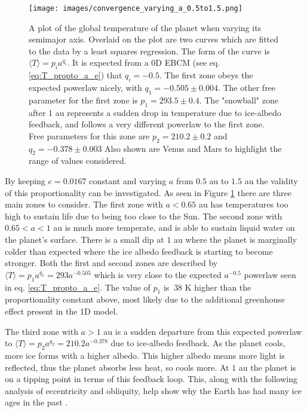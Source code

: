 \documentclass[12pt, onecolumn]{revtex4-2}    %
\begin{document}
\begin{figure}
  \texttt{[image: images/convergence\_varying\_a\_0.5to1.5.png]}
  \caption{
    A plot of the global temperature of the planet when varying its semimajor axis.
    Overlaid on the plot are two curves which are fitted to the data by a least squares regression.
    The form of the curve is $\langle T \rangle = p_i a^{q_i}$.
    It is expected from a 0D EBCM (see eq. \eqref{eq:T_propto_a_e}) that $q_i = -0.5$.
    The first zone obeys the expected powerlaw nicely, with $q_1 = -0.505 \pm 0.004$.
    The other free parameter for the first zone is $p_1 = 293.5 \pm 0.4$.
    The "snowball" zone after 1 au represents a sudden drop in temperature due to ice-albedo feedback, and follows a very different powerlaw to the first zone.
    Free parameters for this zone are $p_2 = 210.2 \pm 0.2$ and $q_2 = -0.378 \pm 0.003$
    Also shown are Venus and Mars to highlight the range of values considered.
  }
  \label{fig:planet_semimajoraxis}
\end{figure}
By keeping $e = 0.0167$ constant and varying $a$ from $0.5$ au to $1.5$ au the validity of this proportionality can be investigated.
As seen in Figure \ref{fig:planet_semimajoraxis} there are three main zones to consider.
The first zone with $a < 0.65$ au has temperatures too high to sustain life due to being too close to the Sun.
The second zone with $0.65 < a < 1$ au is much more temperate, and is able to sustain liquid water on the planet's surface.
There is a small dip at $1$ au where the planet is marginally colder than expected where the ice albedo feedback is starting to become stronger.
Both the first and second zones are described by $\langle T \rangle = p_1 a^{q_1} = 293 a^{-0.505}$ which is very close to the expected $a^{-0.5}$ powerlaw seen in eq. \eqref{eq:T_propto_a_e}.
The value of $p_1$ is $~38$ K higher than the proportionality constant above, most likely due to the additional greenhouse effect present in the 1D model.

The third zone with $a > 1$ au is a sudden departure from this expected powerlaw to $\langle T \rangle = p_2 a^{q_2} = 210.2 a^{-0.378}$ due to ice-albedo feedback.
As the planet cools, more ice forms with a higher albedo.
This higher albedo means more light is reflected, thus the planet absorbs less heat, so cools more.
At $1$ au the planet is on a tipping point in terms of this feedback loop.
This, along with the following analysis of eccentricity and obliquity, help show why the Earth has had many ice ages in the past \cite{Emiliani78}.
\end{document}

